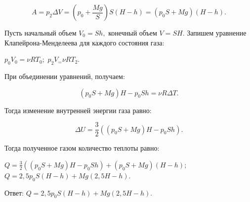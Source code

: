 \documentclass[12pt,a4paper]{article}
\begin{document}
{\[A=p_2\Delta V= ( p_0 + \frac{Mg}{S} ) S ( H - h ) = ( p_0S + Mg ) ( H - h ) .\]

Пусть начальный объем $V_0=Sh,$ конечный объем $V=SH.$
Запишем уравнение Клапейрона-Менделеева для каждого состояния газа:

$p_0V_0=\nu RT_0;$
$p_2V_=\nu RT_2.$

При объединении уравнений, получаем:

\[( p_0S + Mg ) H - p_0Sh=\nu R\Delta T.\]

Тогда изменение внутренней энергии газа равно:

\[\Delta U= \frac{3}{2} ( ( p_0S + Mg ) H - p_0Sh ) .\]

Тогда полученное газом количество теплоты равно:

$Q= \frac{3}{2} ( ( p_0S + Mg ) H - p_0Sh ) + ( p_0S + Mg ) ( H - h ) ;$
$Q= 2{,}5p_0S ( H - h ) + Mg ( 2{,}5H - h ) .$

Ответ: $Q= 2{,}5p_0S ( H - h ) + Mg ( 2{,}5H - h ) .$
}
\end{document}

